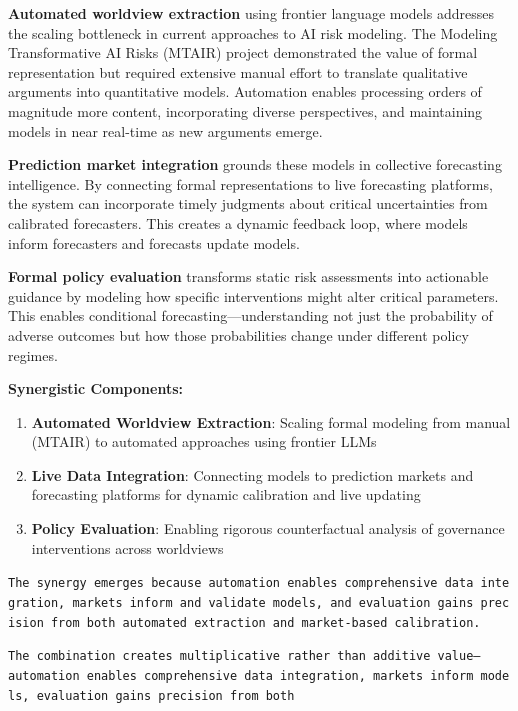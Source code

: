 \documentclass[
  11pt,
  letterpaper,
]{book}
\providecommand{\tightlist}{%
  \setlength{\itemsep}{0pt}\setlength{\parskip}{0pt}}
\begin{document}
\textbf{Automated worldview extraction} using frontier language models
addresses the scaling bottleneck in current approaches to AI risk
modeling. The Modeling Transformative AI Risks (MTAIR) project
demonstrated the value of formal representation but required extensive
manual effort to translate qualitative arguments into quantitative
models. Automation enables processing orders of magnitude more content,
incorporating diverse perspectives, and maintaining models in near
real-time as new arguments emerge.

\textbf{Prediction market integration} grounds these models in
collective forecasting intelligence. By connecting formal
representations to live forecasting platforms, the system can
incorporate timely judgments about critical uncertainties from
calibrated forecasters. This creates a dynamic feedback loop, where
models inform forecasters and forecasts update models.

\textbf{Formal policy evaluation} transforms static risk assessments
into actionable guidance by modeling how specific interventions might
alter critical parameters. This enables conditional
forecasting---understanding not just the probability of adverse outcomes
but how those probabilities change under different policy regimes.

\textbf{Synergistic Components:}

\begin{enumerate}
\def\labelenumi{\arabic{enumi}.}
\tightlist
\item
  \textbf{Automated Worldview Extraction}: Scaling formal modeling from
  manual (MTAIR) to automated approaches using frontier LLMs
\item
  \textbf{Live Data Integration}: Connecting models to prediction
  markets and forecasting platforms for dynamic calibration and live
  updating
\item
  \textbf{Policy Evaluation}: Enabling rigorous counterfactual analysis
  of governance interventions across worldviews
\end{enumerate}

\texttt{The\ synergy\ emerges\ because\ automation\ enables\ comprehensive\ data\ integration,\ markets\ inform\ and\ validate\ models,\ and\ evaluation\ gains\ precision\ from\ both\ automated\ extraction\ and\ market-based\ calibration.}

\texttt{The\ combination\ creates\ multiplicative\ rather\ than\ additive\ value—automation\ enables\ comprehensive\ data\ integration,\ markets\ inform\ models,\ evaluation\ gains\ precision\ from\ both}
\end{document}

